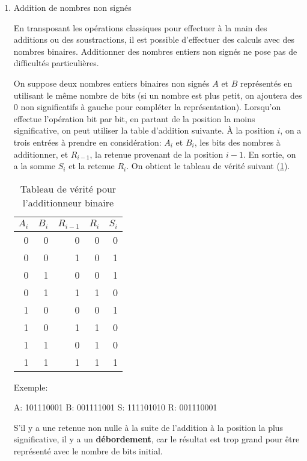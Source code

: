 \documentclass[letter, oneside]{book}
\begin{document}
\begin{enumerate}
\item Addition de nombres non signés
\label{sec:org101349c}

En transposant les opérations classiques pour effectuer à la main des
additions ou des soustractions, il est possible d'effectuer des
calculs avec des nombres binaires. Additionner des nombres entiers non
signés ne pose pas de difficultés particulières.

On suppose deux nombres entiers binaires non signés \(A\) et \(B\)
représentés en utilisant le même nombre de bits (si un nombre est plus
petit, on ajoutera des 0 non significatifs à gauche pour compléter la
représentation). Lorsqu'on effectue l'opération bit par bit, en
partant de la position la moins significative, on peut utiliser la
table d'addition suivante. À la position \(i\), on a trois entrées à
prendre en considération: \(A_{i}\) et \(B_{i}\), les bits des nombres
à additionner, et \(R_{i-1}\), la retenue provenant de la position
\(i-1\). En sortie, on a la somme \(S_{i}\) et la retenue \(R_{i}\).
On obtient le tableau de vérité suivant (\ref{tab:org4e0864f}).

\begin{table}[htbp]
\caption{\label{tab:org4e0864f}Tableau de vérité pour l'additionneur binaire}
\centering
\begin{tabular}{rrrrr}
\(A_{i}\) & \(B_{i}\) & \(R_{i-1}\) & \(R_{i}\) & \(S_{i}\)\\[0pt]
\hline
0 & 0 & 0 & 0 & 0\\[0pt]
0 & 0 & 1 & 0 & 1\\[0pt]
0 & 1 & 0 & 0 & 1\\[0pt]
0 & 1 & 1 & 1 & 0\\[0pt]
1 & 0 & 0 & 0 & 1\\[0pt]
1 & 0 & 1 & 1 & 0\\[0pt]
1 & 1 & 0 & 1 & 0\\[0pt]
1 & 1 & 1 & 1 & 1\\[0pt]
\end{tabular}
\end{table}


Exemple:

A: 101110001
B: 001111001
S: 111101010
R: 001110001

S'il y a une retenue non nulle à la suite de l'addition à la position
la plus significative, il y a un \textbf{débordement}, car le résultat est trop
grand pour être représenté avec le nombre de bits initial.


\end{enumerate}
\end{document}
